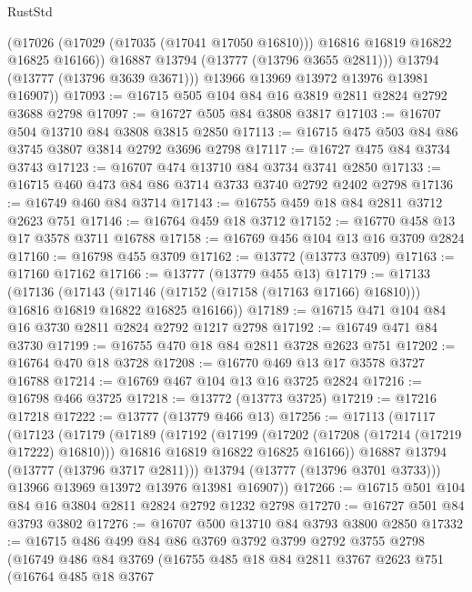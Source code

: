 \begin{lexlean}{RustStd}
\begin{coremodule}
              (@17026 (@17029 (@17035 (@17041 @17050 @16810))) @16816 @16819 @16822 @16825 @16166))
            @16887
            @13794
            (@13777 (@13796 @3655 @2811)))
          @13794
          (@13777 (@13796 @3639 @3671)))
        @13966
        @13969
        @13972
        @13976
        @13981
        @16907))
@17093 := @16715 @505 @104 @84 @16 @3819 @2811 @2824 @2792 @3688 @2798
@17097 := @16727 @505 @84 @3808 @3817
@17103 := @16707 @504 @13710 @84 @3808 @3815 @2850
@17113 := @16715 @475 @503 @84 @86 @3745 @3807 @3814 @2792 @3696 @2798
@17117 := @16727 @475 @84 @3734 @3743
@17123 := @16707 @474 @13710 @84 @3734 @3741 @2850
@17133 := @16715 @460 @473 @84 @86 @3714 @3733 @3740 @2792 @2402 @2798
@17136 := @16749 @460 @84 @3714
@17143 := @16755 @459 @18 @84 @2811 @3712 @2623 @751
@17146 := @16764 @459 @18 @3712
@17152 := @16770 @458 @13 @17 @3578 @3711 @16788
@17158 := @16769 @456 @104 @13 @16 @3709 @2824
@17160 := @16798 @455 @3709
@17162 := @13772 (@13773 @3709)
@17163 := @17160 @17162
@17166 := @13777 (@13779 @455 @13)
@17179 := @17133
    (@17136
      (@17143 (@17146 (@17152 (@17158 (@17163 @17166) @16810))) @16816 @16819 @16822 @16825 @16166))
@17189 := @16715 @471 @104 @84 @16 @3730 @2811 @2824 @2792 @1217 @2798
@17192 := @16749 @471 @84 @3730
@17199 := @16755 @470 @18 @84 @2811 @3728 @2623 @751
@17202 := @16764 @470 @18 @3728
@17208 := @16770 @469 @13 @17 @3578 @3727 @16788
@17214 := @16769 @467 @104 @13 @16 @3725 @2824
@17216 := @16798 @466 @3725
@17218 := @13772 (@13773 @3725)
@17219 := @17216 @17218
@17222 := @13777 (@13779 @466 @13)
@17256 := @17113
    (@17117
      (@17123
        (@17179
          (@17189
            (@17192
              (@17199
                (@17202 (@17208 (@17214 (@17219 @17222) @16810)))
                @16816
                @16819
                @16822
                @16825
                @16166))
            @16887
            @13794
            (@13777 (@13796 @3717 @2811)))
          @13794
          (@13777 (@13796 @3701 @3733)))
        @13966
        @13969
        @13972
        @13976
        @13981
        @16907))
@17266 := @16715 @501 @104 @84 @16 @3804 @2811 @2824 @2792 @1232 @2798
@17270 := @16727 @501 @84 @3793 @3802
@17276 := @16707 @500 @13710 @84 @3793 @3800 @2850
@17332 := @16715
    @486
    @499
    @84
    @86
    @3769
    @3792
    @3799
    @2792
    @3755
    @2798
    (@16749
      @486
      @84
      @3769
      (@16755
        @485
        @18
        @84
        @2811
        @3767
        @2623
        @751
        (@16764
          @485
          @18
          @3767

\end{coremodule}
\end{lexlean}
